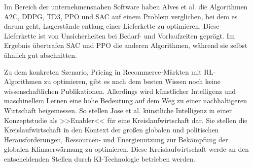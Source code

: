Im Bereich der unternehmensnahen Software haben Alves et al. die Algorithmen A2C, DDPG, TD3, PPO und SAC auf einem Problem verglichen, bei dem es darum geht, Lagerstände entlang einer Lieferkette zu optimieren. \cite{10.1007/978-3-030-87897-9_21}
Diese Lieferkette ist von Unsicherheiten  bei Bedarf- und Vorlaufzeiten geprägt.
Im Ergebnis übertrafen SAC und PPO die anderen Algorithmen, während sie selbst ähnlich gut abschnitten.

Zu dem konkreten Szenario, Pricing in Recommerce-Märkten mit RL-Algorithmen zu optimieren, gibt es nach dem besten Wissen noch keine wissenschaftlichen Publikationen.
Allerdings wird künstlicher Intelligenz und maschinellem Lernen eine hohe Bedeutung auf dem Weg zu einer nachhaltigeren Wirtschaft beigemessen.
So stellen Jose et al. künstliche Intelligenz in einer Konzeptstudie als >>Enabler<< für eine Kreislaufwirtschaft dar. \cite{Jose2020}
Sie stellen die Kreislaufwirtschaft in den Kontext der großen globalen und politischen Herausforderungen, Ressourcen- und Energienutzung zur Bekämpfung der globalen Klimaerwärmung zu optimieren.
Diese Kreislaufwirtschaft werde an den entscheidenden Stellen durch KI-Technologie betrieben werden.